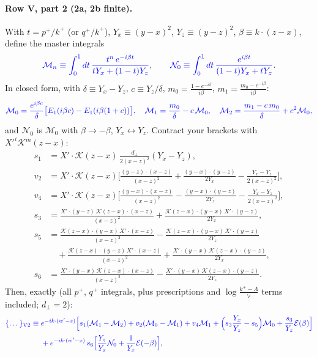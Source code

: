 \documentclass[10pt]{article}
\numberwithin{equation}{section}
\newcommand{\new}[1]{{\color{blue}#1}}
\newcommand{\KK}{\mathcal K}
\newcommand{\EE}{\mathcal E}
\begin{document}
\paragraph{Row V, part 2 (2a, 2b finite).} With $t=p^+/k^+$ (or $q^+/k^+$), $Y_x\equiv(y-x)^2$, $Y_z\equiv(y-z)^2$, $\beta\equiv k\cdot(z-x)$, define the master integrals
\begin{equation*}
\new{\mathcal M_n\equiv\int_0^1dt\,\frac{t^n\,e^{-i\beta t}}{tY_x+(1-t)Y_z},\qquad\mathcal N_0\equiv\int_0^1dt\,\frac{e^{i\beta t}}{(1-t)Y_x+tY_z}}.
\end{equation*}
In closed form, with $\delta\equiv Y_x-Y_z$, $c\equiv Y_z/\delta$, $m_0=\frac{1-e^{-i\beta}}{i\beta}$, $m_1=\frac{m_0-e^{-i\beta}}{i\beta}$:
\begin{equation*}
\new{\mathcal M_0=\frac{e^{i\beta c}}{\delta}\big[E_1(i\beta c)-E_1(i\beta(1+c))\big],\quad\mathcal M_1=\frac{m_0}{\delta}-c\,\mathcal M_0,\quad\mathcal M_2=\frac{m_1-c\,m_0}{\delta}+c^2\mathcal M_0,}
\end{equation*}
and $\mathcal N_0$ is $\mathcal M_0$ with $\beta\to-\beta$, $Y_x\leftrightarrow Y_z$. Contract your brackets with $X'^i\KK^m(z-x)$:
\begin{align*}
s_1&=X'\!\cdot\KK(z-x)\,\frac{d_\perp}{2(x-z)^2}(Y_x-Y_z),\\
v_2&=X'\!\cdot\KK(z-x)\Big[\frac{(y-z)\cdot(x-z)}{(x-z)^2}+\frac{(y-x)\cdot(y-z)}{2Y_x}-\frac{Y_x-Y_z}{2(x-z)^2}\Big],\\
v_4&=X'\!\cdot\KK(z-x)\Big[\frac{(y-x)\cdot(x-z)}{(x-z)^2}-\frac{(y-x)\cdot(y-z)}{2Y_z}-\frac{Y_x-Y_z}{2(x-z)^2}\Big],\\
s_3&=\frac{X'\!\cdot(y-z)\,\KK(z-x)\cdot(x-z)}{(x-z)^2}+\frac{\KK(z-x)\cdot(y-x)\,X'\!\cdot(y-z)}{2Y_x},\\
s_5&=\frac{\KK(z-x)\cdot(y-x)\,X'\!\cdot(x-z)}{(x-z)^2}-\frac{\KK(z-x)\cdot(y-x)\,X'\!\cdot(y-z)}{2Y_z}\\&\quad+\frac{\KK(z-x)\cdot(y-z)\,X'\!\cdot(x-z)}{(x-z)^2}+\frac{X'\!\cdot(y-x)\,\KK(z-x)\cdot(y-z)}{2Y_x},\\
s_6&=\frac{X'\!\cdot(y-x)\,\KK(z-x)\cdot(x-z)}{(x-z)^2}-\frac{X'\!\cdot(y-x)\,\KK(z-x)\cdot(y-z)}{2Y_z}.
\end{align*}
Then, exactly (all $p^+$, $q^+$ integrals, plus prescriptions and $\log\frac{k^+-\Lambda}{\vee}$ terms included; $d_\perp=2$):
\begin{equation}
\new{\begin{aligned}\{\dots\}_{\rm V2}\equiv{}&e^{-ik\cdot(w'-z)}\Big[s_1(\mathcal M_1-\mathcal M_2)+v_2(\mathcal M_0-\mathcal M_1)+v_4\mathcal M_1+\Big(s_3\frac{Y_x}{Y_z}-s_5\Big)\mathcal M_0+\frac{s_3}{Y_z}\EE(\beta)\Big]\\
&+e^{-ik\cdot(w'-x)}\,s_6\Big[\frac{Y_z}{Y_x}\mathcal N_0+\frac{1}{Y_x}\EE(-\beta)\Big],\end{aligned}}
\label{eq:V2br}
\end{equation}
\end{document}
